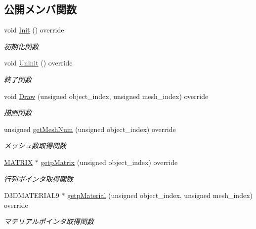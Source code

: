 \subsection*{公開メンバ関数}
\begin{DoxyCompactItemize}
\item 
void \mbox{\hyperlink{class_enemy_draw_aa1659c35fa757db6a6cf07e26ad9ddfb}{Init}} () override
\begin{DoxyCompactList}\small\item\em 初期化関数 \end{DoxyCompactList}\item 
void \mbox{\hyperlink{class_enemy_draw_a2861dc0623b0be7726bc69a6a469190e}{Uninit}} () override
\begin{DoxyCompactList}\small\item\em 終了関数 \end{DoxyCompactList}\item 
void \mbox{\hyperlink{class_enemy_draw_a20a23c1c5fd5e510d15e8ca27aabd821}{Draw}} (unsigned object\+\_\+index, unsigned mesh\+\_\+index) override
\begin{DoxyCompactList}\small\item\em 描画関数 \end{DoxyCompactList}\item 
unsigned \mbox{\hyperlink{class_enemy_draw_a1d8a943e4b625795bbd5ae614cc38ed1}{get\+Mesh\+Num}} (unsigned object\+\_\+index) override
\begin{DoxyCompactList}\small\item\em メッシュ数取得関数 \end{DoxyCompactList}\item 
\mbox{\hyperlink{_vector3_d_8h_a032295cd9fb1b711757c90667278e744}{M\+A\+T\+R\+IX}} $\ast$ \mbox{\hyperlink{class_enemy_draw_afbb8ac19041abda280ece7737103dc66}{getp\+Matrix}} (unsigned object\+\_\+index) override
\begin{DoxyCompactList}\small\item\em 行列ポインタ取得関数 \end{DoxyCompactList}\item 
D3\+D\+M\+A\+T\+E\+R\+I\+A\+L9 $\ast$ \mbox{\hyperlink{class_enemy_draw_a3f2885da84533364daaaac4a801fbc46}{getp\+Material}} (unsigned object\+\_\+index, unsigned mesh\+\_\+index) override
\begin{DoxyCompactList}\small\item\em マテリアルポインタ取得関数 \end{DoxyCompactList}\end{DoxyCompactItemize}
